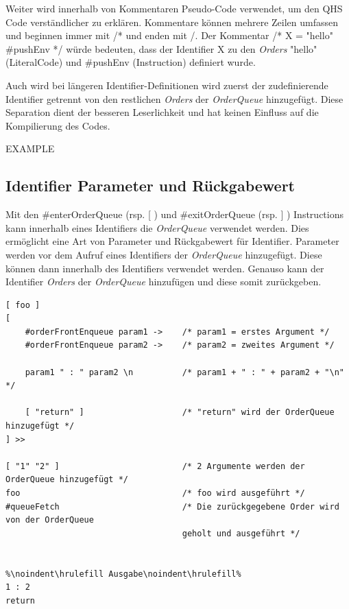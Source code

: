 Weiter wird innerhalb von Kommentaren Pseudo-Code verwendet, um den QHS Code verständlicher zu erklären.
Kommentare können mehrere Zeilen umfassen und beginnen immer mit {\listingFont\selectfont /*} und enden mit {\listingFont\selectfont*/}.
Der Kommentar {\listingFont\selectfont /* X = "hello" \#pushEnv */} würde bedeuten,
dass der Identifier {\listingFont\selectfont X} zu den \textit{Orders} {\listingFont\selectfont "hello" (LiteralCode)} und {\listingFont\selectfont \#pushEnv (Instruction)} definiert wurde. 

Auch wird bei längeren Identifier-Definitionen wird zuerst der zudefinierende Identifier getrennt von den restlichen \textit{Orders} der \textit{OrderQueue} hinzugefügt.
Diese Separation dient der besseren Leserlichkeit und hat keinen Einfluss auf die Kompilierung des Codes.

EXAMPLE

\subsection{Identifier Parameter und Rückgabewert}
Mit den \#enterOrderQueue (rsp. [ ) und \#exitOrderQueue (rsp. ] ) Instructions kann innerhalb eines Identifiers die \textit{OrderQueue} verwendet werden. Dies ermöglicht eine Art von Parameter und Rückgabewert für Identifier.
Parameter werden vor dem Aufruf eines Identifiers der \textit{OrderQueue} hinzugefügt. Diese können dann innerhalb des Identifiers verwendet werden.
Genauso kann der Identifier \textit{Orders} der \textit{OrderQueue} hinzufügen und diese somit zurückgeben.

\begin{lstlisting}[language=QHS, caption=Verwendung von Parametern und Rückgabewert eines Identifiers]
[ foo ]
[
    #orderFrontEnqueue param1 ->    /* param1 = erstes Argument */
    #orderFrontEnqueue param2 ->    /* param2 = zweites Argument */

    param1 " : " param2 \n          /* param1 + " : " + param2 + "\n" */

    [ "return" ]                    /* "return" wird der OrderQueue hinzugefügt */
] >>

[ "1" "2" ]                         /* 2 Argumente werden der OrderQueue hinzugefügt */
foo                                 /* foo wird ausgeführt */
#queueFetch                         /* Die zurückgegebene Order wird von der OrderQueue
                                    geholt und ausgeführt */


%\noindent\hrulefill Ausgabe\noindent\hrulefill%
1 : 2
return
\end{lstlisting}



